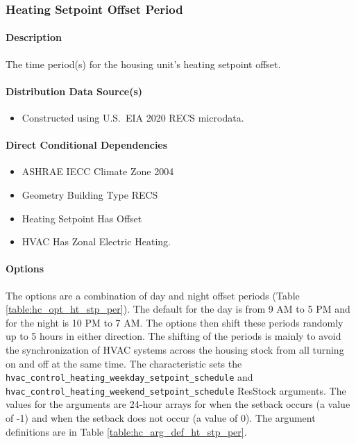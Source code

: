 \subsubsection{Heating Setpoint Offset Period}
\paragraph{Description}
The time period(s) for the housing unit's heating setpoint offset. 

\paragraph{Distribution Data Source(s)}
\begin{itemize}
\item Constructed using U.S.~EIA 2020 RECS microdata.
\end{itemize}

\paragraph{Direct Conditional Dependencies}
\begin{itemize}
    \item ASHRAE IECC Climate Zone 2004
    \item Geometry Building Type RECS
    \item Heating Setpoint Has Offset
    \item HVAC Has Zonal Electric Heating.
\end{itemize}

\paragraph{Options}
The options are a combination of day and night offset periods (Table \ref{table:hc_opt_ht_stp_per}). The default for the day is from 9 AM to 5 PM and for the night is 10 PM to 7 AM. The options then shift these periods randomly up to 5 hours in either direction. The shifting of the periods is mainly to avoid the synchronization of HVAC systems across the housing stock from all turning on and off at the same time. The characteristic sets the \texttt{hvac\_control\_heating\_weekday\_setpoint\_schedule} and \texttt{hvac\_control\_heating\_weekend\_setpoint\_schedule} ResStock arguments. The values for the arguments are 24-hour arrays for when the setback occurs (a value of -1) and when the setback does not occur (a value of 0). The argument definitions are in Table \ref{table:hc_arg_def_ht_stp_per}.

